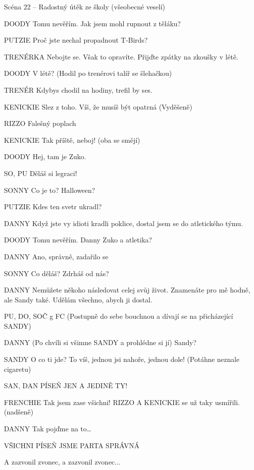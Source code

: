 Scéna 22  – Radostný útěk ze školy (všeobecné veselí)

DOODY        Tomu nevěřím. Jak jsem mohl rupnout z těláku?

PUTZIE        Proč jste nechal propadnout T-Birds?

TRENÉRKA        Nebojte se. Však to opravíte. Přijďte zpátky na zkoušky v létě.

DOODY        V létě? (Hodil po trenérovi talíř se šlehačkou)

TRENÉR        Kdybys chodil na hodiny, trefil by ses.

KENICKIE        Slez z toho. Víš, že musíš být opatrná (Vyděšeně)

RIZZO        Falešný poplach

KENICKIE        Tak příště, neboj! (oba se smějí)

DOODY        Hej, tam je Zuko. 

SO, PU        Děláš si legraci!

SONNY        Co je to? Halloween?

PUTZIE        Kdes ten svetr ukradl?

DANNY        Když jste vy idioti kradli poklice, dostal jsem se do atletického týmu. 

DOODY        Tomu nevěřím. Danny Zuko a atletika?

DANNY        Ano, správně, zadařilo se

SONNY        Co děláš? Zdrháš od nás?

DANNY        Nemůžete někoho následovat celej svůj život. Znamenáte pro mě hodně, ale         Sandy také. Udělám všechno, abych ji dostal. 

PU, DO, SOČ g FC        (Postupně do sebe bouchnou a dívají se na přicházející SANDY) 

DANNY        (Po chvíli si všimne SANDY a prohlédne si jí) Sandy?

SANDY        O co ti jde?  To víš, jednou jsi nahoře, jednou dole! (Potáhne neznale         cigaretu)

SAN, DAN        PÍSEŇ JEN A JEDINĚ TY! 





FRENCHIE        Tak jsem zase všichni! RIZZO A KENICKIE se už taky usmířili. (nadšeně) 

DANNY        Tak pojďme na to…

VŠICHNI        PÍSEŇ JSME PARTA SPRÁVNÁ 

A zazvonil zvonec, a zazvonil zvonec...



\bye

